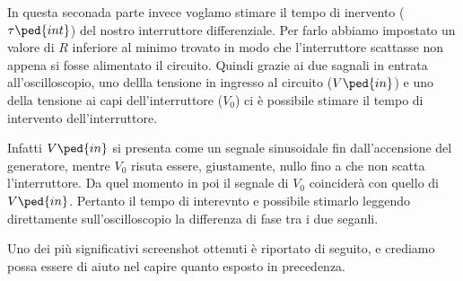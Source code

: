 In questa seconada parte invece voglamo stimare il tempo di inervento ($\tau\ped{int}$) del nostro interruttore differenziale. Per farlo abbiamo impostato un valore di $R$ inferiore al minimo trovato in modo che l'interruttore scattasse non appena si fosse alimentato il circuito. Quindi grazie ai due sagnali in entrata all'oscilloscopio, uno dellla tensione in ingresso al circuito ($V\ped{in}$) e uno della tensione ai capi dell'interruttore ($V_0$) ci è possibile stimare il tempo di intervento dell'interruttore.

Infatti $V\ped{in}$ si presenta come un segnale sinusoidale fin dall'accensione del generatore, mentre $V_0$ risuta essere, giustamente, nullo fino a che non scatta l'interruttore. Da quel momento in poi il segnale di $V_0$ coinciderà con quello di $V\ped{in}$. Pertanto il tempo di interevnto e possibile stimarlo leggendo direttamente sull'oscilloscopio la differenza di fase tra i due seganli.

Uno dei più significativi screenshot ottenuti è riportato di seguito, e crediamo possa essere di aiuto nel capire quanto esposto in precedenza.
 
